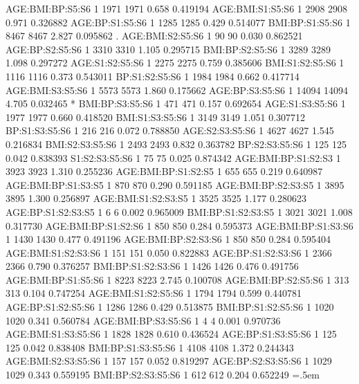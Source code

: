 \documentclass[runningheads]{llncs}
\newenvironment{lcverbatim}
 {\SaveVerbatim{cverb}}
 {\endSaveVerbatim
  \flushleft\fboxrule=0pt\fboxsep=.5em
  \colorbox{cverbbg}{%
    \makebox[\dimexpr\linewidth-2\fboxsep][l]{\BUseVerbatim{cverb}}%
  }
  \endflushleft
}
\begin{document}
\begin{lcverbatim}
AGE:BMI:BP:S5:S6        1   1971    1971   0.658 0.419194    
AGE:BMI:S1:S5:S6        1   2908    2908   0.971 0.326882    
AGE:BP:S1:S5:S6         1   1285    1285   0.429 0.514077    
BMI:BP:S1:S5:S6         1   8467    8467   2.827 0.095862 .  
AGE:BMI:S2:S5:S6        1     90      90   0.030 0.862521    
AGE:BP:S2:S5:S6         1   3310    3310   1.105 0.295715    
BMI:BP:S2:S5:S6         1   3289    3289   1.098 0.297272    
AGE:S1:S2:S5:S6         1   2275    2275   0.759 0.385606    
BMI:S1:S2:S5:S6         1   1116    1116   0.373 0.543011    
BP:S1:S2:S5:S6          1   1984    1984   0.662 0.417714    
AGE:BMI:S3:S5:S6        1   5573    5573   1.860 0.175662    
AGE:BP:S3:S5:S6         1  14094   14094   4.705 0.032465 *  
BMI:BP:S3:S5:S6         1    471     471   0.157 0.692654    
AGE:S1:S3:S5:S6         1   1977    1977   0.660 0.418520    
BMI:S1:S3:S5:S6         1   3149    3149   1.051 0.307712    
BP:S1:S3:S5:S6          1    216     216   0.072 0.788850    
AGE:S2:S3:S5:S6         1   4627    4627   1.545 0.216834    
BMI:S2:S3:S5:S6         1   2493    2493   0.832 0.363782    
BP:S2:S3:S5:S6          1    125     125   0.042 0.838393    
S1:S2:S3:S5:S6          1     75      75   0.025 0.874342    
AGE:BMI:BP:S1:S2:S3     1   3923    3923   1.310 0.255236    
AGE:BMI:BP:S1:S2:S5     1    655     655   0.219 0.640987    
AGE:BMI:BP:S1:S3:S5     1    870     870   0.290 0.591185    
AGE:BMI:BP:S2:S3:S5     1   3895    3895   1.300 0.256897    
AGE:BMI:S1:S2:S3:S5     1   3525    3525   1.177 0.280623    
AGE:BP:S1:S2:S3:S5      1      6       6   0.002 0.965009    
BMI:BP:S1:S2:S3:S5      1   3021    3021   1.008 0.317730    
AGE:BMI:BP:S1:S2:S6     1    850     850   0.284 0.595373    
AGE:BMI:BP:S1:S3:S6     1   1430    1430   0.477 0.491196    
AGE:BMI:BP:S2:S3:S6     1    850     850   0.284 0.595404    
AGE:BMI:S1:S2:S3:S6     1    151     151   0.050 0.822883    
AGE:BP:S1:S2:S3:S6      1   2366    2366   0.790 0.376257    
BMI:BP:S1:S2:S3:S6      1   1426    1426   0.476 0.491756    
AGE:BMI:BP:S1:S5:S6     1   8223    8223   2.745 0.100708    
AGE:BMI:BP:S2:S5:S6     1    313     313   0.104 0.747254    
AGE:BMI:S1:S2:S5:S6     1   1794    1794   0.599 0.440781    
AGE:BP:S1:S2:S5:S6      1   1286    1286   0.429 0.513875    
BMI:BP:S1:S2:S5:S6      1   1020    1020   0.341 0.560784    
AGE:BMI:BP:S3:S5:S6     1      4       4   0.001 0.970736    
AGE:BMI:S1:S3:S5:S6     1   1828    1828   0.610 0.436524    
AGE:BP:S1:S3:S5:S6      1    125     125   0.042 0.838408    
BMI:BP:S1:S3:S5:S6      1   4108    4108   1.372 0.244343    
AGE:BMI:S2:S3:S5:S6     1    157     157   0.052 0.819297    
AGE:BP:S2:S3:S5:S6      1   1029    1029   0.343 0.559195    
BMI:BP:S2:S3:S5:S6      1    612     612   0.204 0.652249    
\end{lcverbatim}
\end{document}
